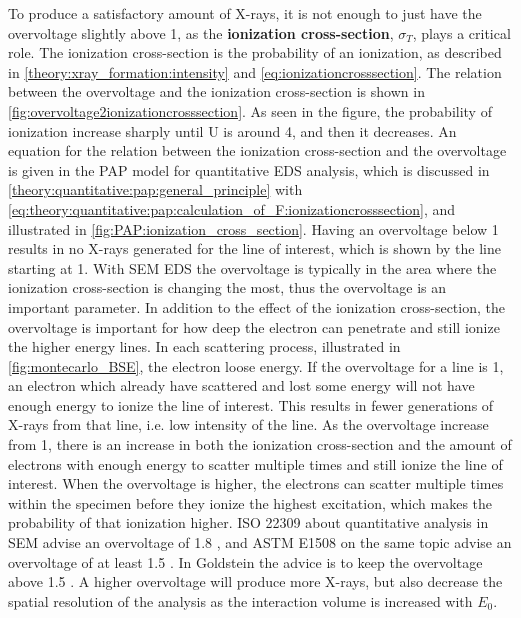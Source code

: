 To produce a satisfactory amount of X-rays, it is not enough to just have the overvoltage slightly above 1, as the \textbf{ionization cross-section}, $\sigma_T$, plays a critical role.
The ionization cross-section is the probability of an ionization, as described in \cref{theory:xray_formation:intensity} and \cref{eq:ionizationcrosssection}.
The relation between the overvoltage and the ionization cross-section is shown in \cref{fig:overvoltage2ionizationcrosssection}.
As seen in the figure, the probability of ionization increase sharply until U is around 4, and then it decreases.
An equation for the relation between the ionization cross-section and the overvoltage is given in the PAP model for quantitative EDS analysis, which is discussed in \cref{theory:quantitative:pap:general_principle} with \cref{eq:theory:quantitative:pap:calculation_of_F:ionizationcrosssection}, and illustrated in \cref{fig:PAP:ionization_cross_section}.
Having an overvoltage below 1 results in no X-rays generated for the line of interest, which is shown by the line starting at 1.
With SEM EDS the overvoltage is typically in the area where the ionization cross-section is changing the most, thus the overvoltage is an important parameter.
In addition to the effect of the ionization cross-section, the overvoltage is important for how deep the electron can penetrate and still ionize the higher energy lines.
In each scattering process, illustrated in \cref{fig:montecarlo_BSE}, the electron loose energy.
If the overvoltage for a line is 1, an electron which already have scattered and lost some energy will not have enough energy to ionize the line of interest.
This results in fewer generations of X-rays from that line, i.e. low intensity of the line.
As the overvoltage increase from 1, there is an increase in both the ionization cross-section and the amount of electrons with enough energy to scatter multiple times and still ionize the line of interest.
When the overvoltage is higher, the electrons can scatter multiple times within the specimen before they ionize the highest excitation, which makes the probability of that ionization higher.
ISO 22309 about quantitative analysis in SEM advise an overvoltage of 1.8 \cite{iso_emsa_22029}, and ASTM E1508 on the same topic advise an overvoltage of at least 1.5 \cite{astm_e1508_eds_quantification}.
In Goldstein the advice is to keep the overvoltage above 1.5 \cite[Ch. 20.2.2]{goldstein_scanning_2018}.
A higher overvoltage will produce more X-rays, but also decrease the spatial resolution of the analysis as the interaction volume is increased with $E_0$. %


